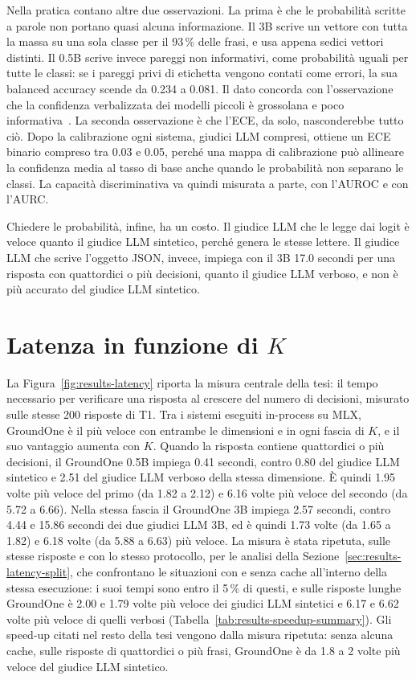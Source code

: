 Nella pratica contano altre due osservazioni. La prima è che le probabilità scritte a parole non portano quasi alcuna
informazione. Il 3B scrive un vettore con tutta la massa su una sola classe per il 93\,\% delle frasi, e usa appena
sedici vettori distinti. Il 0.5B scrive invece pareggi non informativi, come probabilità uguali per tutte le classi: se
i pareggi privi di etichetta vengono contati come errori, la sua balanced accuracy scende da 0.234 a 0.081. Il dato
concorda con l'osservazione che la confidenza verbalizzata dei modelli piccoli è grossolana e poco
informativa~\cite{xiong2024uncertainty,tian2023justask}. La seconda osservazione è che l'ECE, da solo, nasconderebbe
tutto ciò. Dopo la calibrazione ogni sistema, giudici LLM compresi, ottiene un ECE binario compreso tra 0.03 e 0.05, perché
una mappa di calibrazione può allineare la confidenza media al tasso di base anche quando le probabilità non separano le
classi. La capacità discriminativa va quindi misurata a parte, con l'AUROC e con l'AURC.

Chiedere le probabilità, infine, ha un costo. Il giudice LLM che le legge dai logit è veloce quanto il giudice LLM sintetico,
perché genera le stesse lettere. Il giudice LLM che scrive l'oggetto JSON, invece, impiega con il 3B 17.0 secondi per una
risposta con quattordici o più decisioni, quanto il giudice LLM verboso, e non è più accurato del giudice LLM sintetico.

\section{Latenza in funzione di $K$}
\label{sec:results-latency}

La Figura~\ref{fig:results-latency} riporta la misura centrale della tesi: il tempo necessario per verificare una
risposta al crescere del numero di decisioni, misurato sulle stesse 200 risposte di T1. Tra i sistemi eseguiti
in-process su MLX, GroundOne è il più veloce con entrambe le dimensioni e in ogni fascia di $K$, e il suo vantaggio
aumenta con $K$. Quando la risposta contiene quattordici o più decisioni, il GroundOne 0.5B impiega 0.41 secondi, contro
0.80 del giudice LLM sintetico e 2.51 del giudice LLM verboso della stessa dimensione. È quindi 1.95 volte più veloce del primo
(da 1.82 a 2.12) e 6.16 volte più veloce del secondo (da 5.72 a 6.66). Nella stessa fascia il GroundOne 3B impiega 2.57
secondi, contro 4.44 e 15.86 secondi dei due giudici LLM 3B, ed è quindi 1.73 volte (da 1.65 a 1.82) e 6.18 volte (da 5.88 a 6.63) più veloce. La misura è stata ripetuta, sulle stesse risposte e con lo stesso protocollo, per le analisi della Sezione~\ref{sec:results-latency-split}, che confrontano le situazioni con e senza cache all'interno della stessa esecuzione: i suoi tempi sono entro il 5\,\% di questi, e sulle risposte lunghe GroundOne è 2.00 e 1.79 volte più veloce dei giudici LLM sintetici e 6.17 e 6.62 volte più veloce di quelli verbosi (Tabella~\ref{tab:results-speedup-summary}). Gli speed-up citati nel resto della tesi vengono dalla misura ripetuta: senza alcuna cache, sulle risposte di quattordici o più frasi, GroundOne è da 1.8 a 2 volte più veloce del giudice LLM sintetico.

